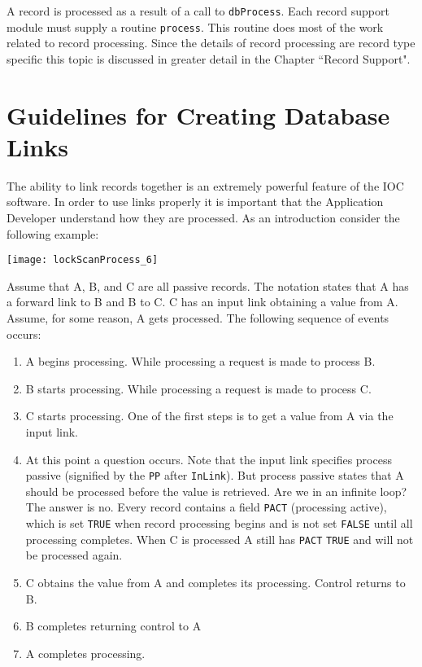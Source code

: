 A record is processed as a result of a call to \verb|dbProcess|.
Each record support module must supply a routine \verb|process|.
This routine does most of the work related to record processing.
Since the details of record processing are record type specific this topic is discussed in greater detail in the Chapter ``Record Support".

\section{Guidelines for Creating Database Links}

The ability to link records together is an extremely powerful feature of the IOC software.
In order to use links properly it is important that the Application Developer understand how they are processed.
As an introduction consider the following example:

\begin{center}
\texttt{[image: lockScanProcess\_6]}
\end{center}

Assume that A, B, and C are all passive records.
The notation states that A has a forward link to B and B to C.
C has an input link obtaining a value from A.
Assume, for some reason, A gets processed.
The following sequence of events occurs:

\begin{enumerate}
\item A begins processing.
While processing a request is made to process B.

\item B starts processing.
While processing a request is made to process C.

\item C starts processing.
One of the first steps is to get a value from A via the input link.

\item At this point a question occurs.
Note that the input link specifies process passive (signified by the \verb|PP| after \verb|InLink|).
But process passive states that A should be processed before the value is retrieved.
Are we in an infinite loop?
The answer is no.
Every record contains a field \verb|PACT| (processing active), which is set \verb|TRUE| when record processing begins and is not set \verb|FALSE| until all processing completes.
When C is processed A still has \verb|PACT| \verb|TRUE| and will not be processed again.

\item C obtains the value from A and completes its processing.
Control returns to B.

\item B completes returning control to A

\item A completes processing.

\end{enumerate}

